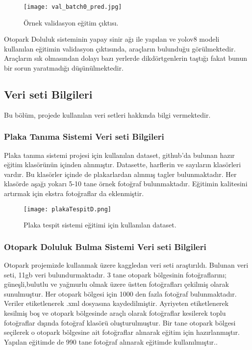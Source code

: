 \documentclass[]{article}
\begin{document}
		\begin{figure}[!ht]
			\centering
			\texttt{[image: val\_batch0\_pred.jpg]}
			\caption{Örnek validasyon eğitim çıktısı.}
		\end{figure}
    
	Otopark Doluluk sisteminin yapay sinir ağı ile yapılan ve yolov8 modeli kullanılan eğitimin validasyon çıktısında, araçların bulunduğu görülmektedir. Araçların sık olmasından dolayı bazı yerlerde dikdörtgenlerin taştığı fakat bunun bir sorun yaratmadığı düşünülmektedir.

	\subsection{Veri seti Bilgileri}
	Bu bölüm, projede kullanılan veri setleri hakkında bilgi vermektedir.
	
	\subsubsection{Plaka Tanıma Sistemi Veri seti Bilgileri}
	Plaka tanıma sistemi projesi için kullanılan dataset, github'da bulunan hazır eğitim klasörünün içinden alınmıştır. Datasette, harflerin ve sayıların klasörleri vardır. Bu klasörler içinde de plakarlardan alınmış tagler bulunmaktadır. Her klasörde aşağı yokarı 5-10 tane örnek fotoğraf bulunmaktadır. Eğitimin kalitesini artırmak için ekstra fotoğraflar da eklenmiştir\cite{github}.
	
	\begin{figure}[!ht]
		\centering
		\texttt{[image: plakaTespitD.png]}
		\caption{Plaka tespit sistemi eğitimi için kullanılan dataset.}
	\end{figure}
	\newpage
	\subsubsection{Otopark Doluluk Bulma Sistemi Veri seti Bilgileri}
	Otopark projemizde kullanmak üzere kaggledan veri seti araştırıldı. Bulunan veri seti, 11gb veri bulundurmaktadır. 3 tane otopark bölgesinin fotoğraflarını; güneşli,bulutlu ve yağmurlu  olmak üzere üstten fotoğrafları çekilmiş olarak sunulmuştur. Her otopark bölgesi için 1000 den fazla fotoğraf bulunmaktadır. Veriler etiketlenerek .xml dosyasına kaydedilmiştir. Ayriyeten etiketlenerek kesilmiş boş ve otopark bölgesinde araçlı olarak fotoğraflar kesilerek toplu fotoğraflar dışında fotoğraf klasörü oluşturulmuştur. Bir tane otopark bölgesi seçilerek o otopark bölgesine ait fotoğraflar alınarak eğitim için hazırlanmıştır. Yapılan eğitimde de 990 tane fotoğraf alınarak eğitimde kullanılmıştır.\cite{dataset}.
	
\end{document}
